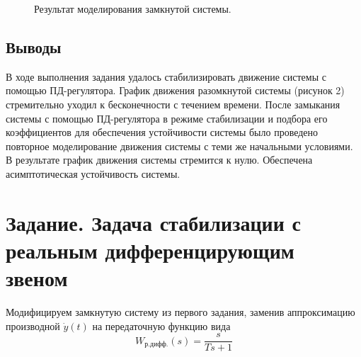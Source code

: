 \documentclass[a5paper, 10pt]{article}
\theoremstyle{definition}
\theoremstyle{plain}
\theoremstyle{remark}
\begin{document}
\begin{figure}[h!]
\caption{Результат моделирования замкнутой системы.}
\end{figure}

\subsection{Выводы}
В ходе выполнения задания удалось стабилизировать движение системы с помощью ПД-регулятора. График движения разомкнутой системы (рисунок 2) стремительно уходил к бесконечности с течением времени. После замыкания системы с помощью ПД-регулятора в режиме стабилизации и подбора его коэффициентов для обеспечения устойчивости системы было проведено повторное моделирование движения системы с теми же начальными условиями. В результате график движения системы стремится к нулю. Обеспечена асимптотическая устойчивость системы.

\newpage
\section{Задание. Задача стабилизации с реальным дифференцирующим звеном}
Модифицируем замкнутую систему из первого задания, заменив аппроксимацию производной $\dot{y} (t)$ на передаточную функцию вида
\begin{equation}
W_{\text{р.дифф.}} (s) = \frac{s}{Ts + 1}
\end{equation}
\end{document}
